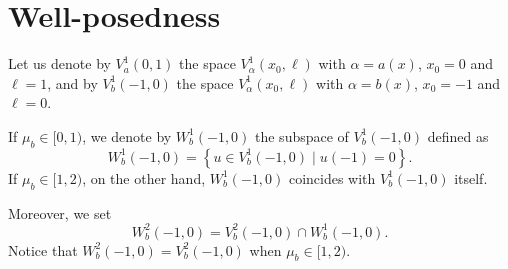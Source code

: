 \documentclass[twoside]{article}
\theoremstyle{noparens}
\theoremstyle{definition}
\numberwithin{equation}{section}
\numberwithin{figure}{section}
\begin{document}
\section{Well-posedness}
Let us denote by $V_a^1(0,1)$  the space $V_{\alpha}^1(x_0,\ell)$ with $\alpha =a(x) $, $x_0 = 0$ and $\ell =1$, and by $V_b^1(-1,0)$ the space $V_{\alpha}^1(x_0,\ell)$ with $\alpha=b(x)$, $x_0 = -1$ and $\ell =0$.

If $\mu_b\in[0,1)$, we denote by $W_{b}^1(-1,0)$ the subspace of $V_{b}^1(-1,0)$ defined as
\begin{equation*}
W_{b}^1(-1,0) =\left\{u\in V_{b}^1(-1,0)\;|\;u(-1) =0\right\}.
\end{equation*}
If $\mu_b\in[1,2)$, on the other hand, $W_{b}^1(-1,0)$ coincides with $V_{b}^1(-1,0)$ itself.

Moreover, we set
$$W_{b}^2(-1,0) = V_{b}^2(-1,0) \cap W_{b}^1(-1,0).$$
Notice that $W_{b}^2(-1,0) = V_{b}^2(-1,0)$ when $\mu_b\in[1,2)$.
\end{document}
